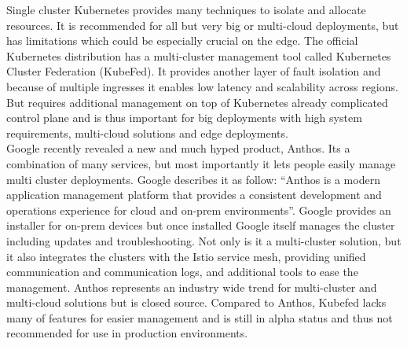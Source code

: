 Single cluster Kubernetes provides many techniques to isolate and allocate resources. It is recommended for all but very big or multi-cloud deployments, but has limitations which could be especially crucial on the edge. The official Kubernetes distribution has a multi-cluster management tool called Kubernetes Cluster Federation (KubeFed)\cite{kubernetesFederation97:online}. It provides another layer of fault isolation and because of multiple ingresses it enables low latency and scalability across regions. But requires additional management on top of Kubernetes already complicated control plane and is thus important for big deployments with high system requirements, multi-cloud solutions and edge deployments.\\
Google recently revealed a new and much hyped product, Anthos\cite{TechnicalAnthosGoogle66:online}. Its a combination of many services, but most importantly it lets people easily manage multi cluster deployments. Google describes it as follow: ``Anthos is a modern application management platform that provides a consistent development and operations experience for cloud and on-prem environments''\cite{TechnicalAnthosGoogle66:online}. Google provides an installer for on-prem devices but once installed Google itself manages the cluster including updates and troubleshooting. Not only is it a multi-cluster solution, but it also integrates the clusters with the Istio service mesh, providing unified communication and communication logs, and additional tools to ease the management. Anthos represents an industry wide trend for multi-cluster and multi-cloud solutions but is closed source. Compared to Anthos, Kubefed lacks many of features for easier management and is still in alpha status and thus not recommended for use in production environments.\\[0.5mm]




